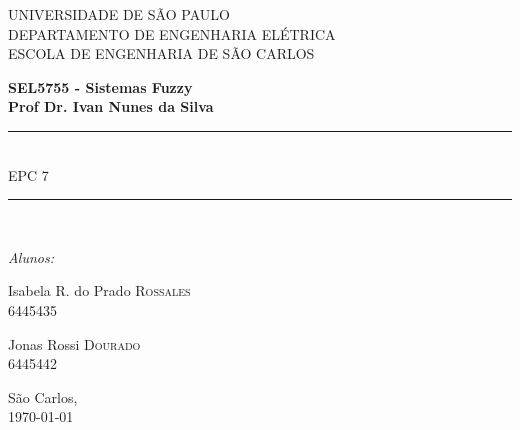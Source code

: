 \documentclass{report}
\begin{document}
\newcommand{\HRule}{\rule{\linewidth}{0.5mm}}
\newcommand{\tsize}[1]{(\frac{W}{L})_{#1}}
 

\begin{titlepage}

\begin{center}


{\LARGE UNIVERSIDADE DE SÃO PAULO\\}
{\LARGE DEPARTAMENTO DE ENGENHARIA ELÉTRICA \\}
{\LARGE ESCOLA DE ENGENHARIA DE SÃO CARLOS\\[4cm]}

\textbf{\large SEL5755 - Sistemas Fuzzy}\\[1cm]
\textbf{\large Prof Dr. Ivan Nunes da Silva}\\[2cm]


\HRule \\[0.6cm]
{ \huge EPC 7\bfseries }\\[0.6cm]

\HRule \\[2cm]


\begin{center} \large
\emph{Alunos:}\\
\end{center}

\begin{minipage}{0.4\textwidth}
\begin{flushleft} \large
Isabela R. do Prado \textsc{Rossales}\\
6445435
\end{flushleft}
\end{minipage}
\begin{minipage}{0.4\textwidth}
\begin{flushright} \large
Jonas Rossi \textsc{Dourado}\\
6445442
\end{flushright}
\end{minipage}

\vfill

{\large São Carlos,\\ \today}

\end{center}

\end{titlepage}
\end{document}
